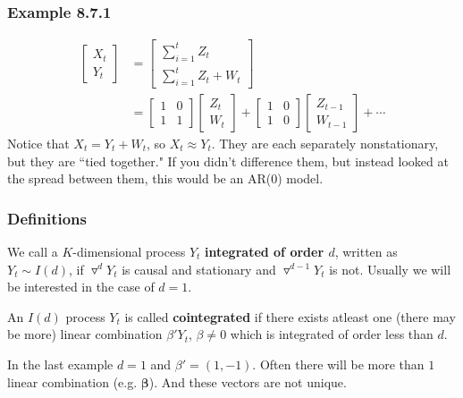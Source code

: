 \documentclass{beamer}
\begin{document}

\begin{frame}
\frametitle{Example 8.7.1}

\begin{align*}
\left[\begin{array}{c}
X_t \\
Y_t
\end{array}\right]
&=
\left[\begin{array}{c}
\sum_{i=1}^t Z_t \\
\sum_{i=1}^t Z_t + W_t
\end{array}\right] \\
&=
\left[ \begin{array}{cc}
1 & 0 \\
1 & 1
\end{array}\right]
\left[\begin{array}{c}
Z_t \\
W_t
\end{array}\right] 
+
\left[ \begin{array}{cc}
1 & 0 \\
1 & 0
\end{array}\right]
\left[\begin{array}{c}
Z_{t-1} \\
W_{t-1}
\end{array}\right]+ \cdots
\end{align*}
Notice that $X_t = Y_t + W_t$, so $X_t \approx Y_t$. They are each separately nonstationary, but they are ``tied together." If you didn't difference them, but instead looked at the spread between them, this would be an AR(0) model.

\end{frame}


\begin{frame}
\frametitle{Definitions}

We call a $K$-dimensional process $Y_t$ {\bf integrated of order $d$}, written as $Y_t \sim I(d)$, if $\triangledown^d Y_t$ is causal and stationary and $\triangledown^{d-1} Y_t$ is not. Usually we will be interested in the case of $d = 1$.
\newline

An $I(d)$ process $Y_t$ is called {\bf cointegrated}  if there exists atleast one (there may be more) linear combination $\beta'Y_t$, $\beta \neq 0$ which is integrated of order less than $d$.
\newline

In the last example $d=1$ and $\beta' = (1,-1)$. Often there will be more than $1$ linear combination (e.g. $\bm{\beta}$). And these vectors are not unique.


\end{frame}
\end{document}
